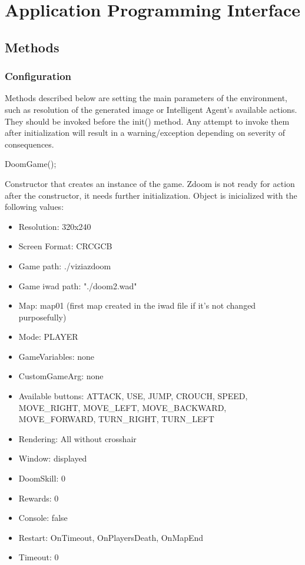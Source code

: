 
\chapter{Application Programming Interface}
\section{Methods}
	\subsection{Configuration}
	Methods described below are setting the main parameters of the environment, such as resolution of the generated image or Intelligent Agent's available actions. They should be invoked before the init() method. Any attempt to invoke them after initialization will result in a warning/exception depending on severity of consequences. 
	\vspace{20pt}

\begin{clinee}
DoomGame();
\end{clinee}

Constructor that creates an instance of the game. Zdoom is not ready for action after the constructor, it needs further initialization. Object is inicialized with the following values:
	\begin{itemize}
\item Resolution: 320x240
\item Screen Format: CRCGCB
\item Game path: ./viziazdoom
\item Game iwad path: "./doom2.wad"
\item Map: map01 (first map created in the iwad file if it's not changed purposefully)
\item Mode: PLAYER
\item GameVariables: none
\item CustomGameArg: none
\item Available buttons: ATTACK, USE, JUMP, CROUCH, SPEED, MOVE\_RIGHT, MOVE\_LEFT, MOVE\_BACKWARD, MOVE\_FORWARD, TURN\_RIGHT, TURN\_LEFT
\item Rendering: All without crosshair
\item Window: displayed 
\item DoomSkill: 0
\item Rewards: 0
\item Console: false
\item Restart: OnTimeout, OnPlayersDeath, OnMapEnd
\item Timeout: 0
	\end{itemize}


